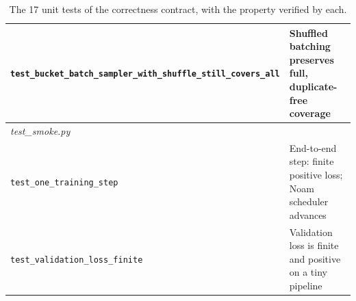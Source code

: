 \documentclass[10pt]{article}
\begin{document}
\begin{table}[htbp]
\begin{tabularx}{\textwidth}{l X}
\texttt{test\_bucket\_batch\_sampler\_with\_shuffle\_still\_covers\_all} & Shuffled batching preserves full, duplicate-free coverage \\
\midrule
\multicolumn{2}{l}{\emph{test\_smoke.py}} \\
\texttt{test\_one\_training\_step} & End-to-end step: finite positive loss; Noam scheduler advances \\
\texttt{test\_validation\_loss\_finite} & Validation loss is finite and positive on a tiny pipeline \\
\bottomrule
\end{tabularx}
\caption{The 17 unit tests of the correctness contract, with the property verified by each.}
\label{tab:tests}
\end{table}
\end{document}
